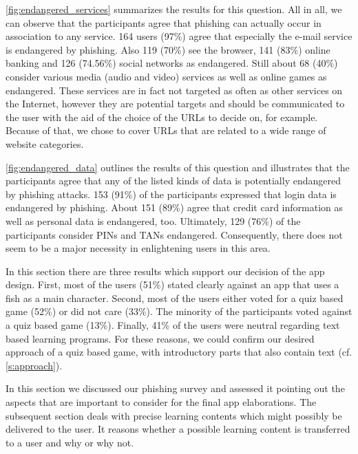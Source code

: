\begin{description}[leftmargin=0cm]
	\item[Services Endangered by Phishing:] \autoref{fig:endangered_services} summarizes the results for this question.
 All in all, we can observe that the participants agree that phishing can actually occur in association to any service.
 164 users (97\%) agree that especially the e-mail service is endangered by phishing.
 Also 119 (70\%) see the browser, 141 (83\%) online banking and 126 (74.56\%) social networks as endangered.
 Still about 68 (40\%) consider various media (audio and video) services as well as online games as endangered.
 These services are in fact not targeted as often as other services on the Internet, however they are potential targets and should be communicated to the user with the aid of the choice of the URLs to decide on, for example.
Because of that, we chose to cover URLs that are related to a wide range of website categories.


	\item[Data Endangered by Phishing:] \autoref{fig:endangered_data} outlines the results of this question and illustrates that the participants agree that any of the listed kinds of data is potentially endangered by phishing attacks.
 153 (91\%) of the participants expressed that login data is endangered by phishing.
 About 151 (89\%) agree that credit card information as well as personal data is endangered, too.
 Ultimately, 129 (76\%) of the participants consider PINs and TANs endangered.
 Consequently, there does not seem to be a major necessity in enlightening users in this area.


	\item[Preferences for an Education App:] In this section there are three results which support our decision of the app design. 
	First, most of the users (51\%) stated clearly against an app that uses a fish as a main character. 
	Second, most of the users either voted for a quiz based game (52\%) or did not care (33\%).
	The minority of the participants voted against a quiz based game (13\%).
	Finally, 41\% of the users were neutral regarding text based learning programs.
	For these reasons, we could confirm our desired approach of a quiz based game, with introductory parts that also contain text (cf. \autoref{s:approach}).
\end{description}

In this section we discussed our phishing survey and assessed it pointing out the aspects that are important to consider for the final app elaborations.
The subsequent section deals with precise learning contents which might possibly be delivered to the user.
It reasons whether a possible learning content is transferred to a user and why or why not.

